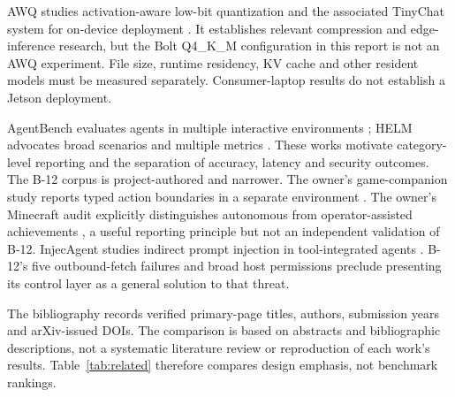 \documentclass[11pt,a4paper]{article}
\begin{document}
AWQ studies activation-aware low-bit quantization and the associated TinyChat system for on-device deployment \cite{awq}. It establishes relevant compression and edge-inference research, but the Bolt Q4\_K\_M configuration in this report is not an AWQ experiment. File size, runtime residency, KV cache and other resident models must be measured separately. Consumer-laptop results do not establish a Jetson deployment.

AgentBench evaluates agents in multiple interactive environments \cite{agentbench}; HELM advocates broad scenarios and multiple metrics \cite{helm}. These works motivate category-level reporting and the separation of accuracy, latency and security outcomes. The B-12 corpus is project-authored and narrower. The owner's game-companion study reports typed action boundaries in a separate environment \cite{wow}. The owner's Minecraft audit explicitly distinguishes autonomous from operator-assisted achievements \cite{minecraft}, a useful reporting principle but not an independent validation of B-12. InjecAgent studies indirect prompt injection in tool-integrated agents \cite{injec}. B-12's five outbound-fetch failures and broad host permissions preclude presenting its control layer as a general solution to that threat.

The bibliography records verified primary-page titles, authors, submission years and arXiv-issued DOIs. The comparison is based on abstracts and bibliographic descriptions, not a systematic literature review or reproduction of each work's results. Table~\ref{tab:related} therefore compares design emphasis, not benchmark rankings.
\end{document}
